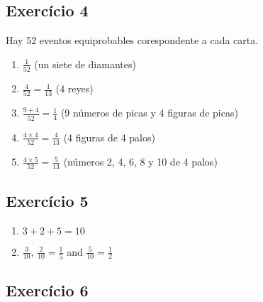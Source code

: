 \subsection*{Exercício 4}

Hay 52 eventos equiprobables corespondente a cada carta.

\begin{enumerate}
\item $\frac{1}{52}$ (un siete de diamantes)
\item $\frac{4}{52} = \frac{1}{13}$ (4 reyes)
\item $\frac{9 + 4}{52} = \frac{1}{4}$ (9 números de picas y 4 figuras de picas)
\item $\frac{4 \times 4}{52} = \frac{4}{13}$ (4 figuras de 4 palos)
\item $\frac{4 \times 5}{52} = \frac{5}{13}$ (números 2, 4, 6, 8 y 10 de 4 palos)
\end{enumerate}

\subsection*{Exercício 5}

\begin{enumerate}
\item $3+2+5=10$
\item $\frac{3}{10}$, $\frac{2}{10} = \frac{1}{5}$ and $\frac{5}{10} =
  \frac{1}{2}$
\end{enumerate}

\subsection*{Exercício 6}

